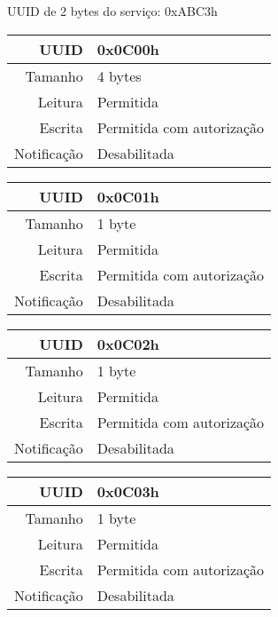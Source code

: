\begin{tcolorbox}[arc=3mm,fontupper=\small,fonttitle=\bfseries,
subtitle style={boxrule=0.4pt, colback=white},colframe=green!25!black,
halign=center,bottom=0mm,
title=Luminosity Sensor Service]
	UUID de 2 bytes do serviço: 0xABC3h
	
	\begin{tcbitemize}[raster columns=2,raster equal height,fontupper=\footnotesize,
	colbacktitle=yellow!100!red!100!black, coltitle=black,
	fonttitle=\footnotesize\bfseries,size=small, halign=center]
	
	\tcbitem [squeezed title={Sensing Interval Characteristic}]
		\begin{tabular}{ r | l }
		UUID & 0x0C00h \\ \hline
		Tamanho & 4 bytes \\ \hline
		Leitura & Permitida \\ \hline
		Escrita & Permitida com autorização \\ \hline
		Notificação & Desabilitada 
		\end{tabular}

		\tcbitem [squeezed title={Sensor Status Characteristic}]
		\begin{tabular}{ r | l }
		UUID & 0x0C01h \\ \hline
		Tamanho & 1 byte \\ \hline
		Leitura & Permitida \\ \hline
		Escrita & Permitida com autorização \\ \hline
		Notificação & Desabilitada 
		\end{tabular}
		
		\tcbitem [squeezed title={Sensor Integration Time Characteristic}]
		\begin{tabular}{ r | l }
		UUID & 0x0C02h \\ \hline
		Tamanho & 1 byte \\ \hline
		Leitura & Permitida \\ \hline
		Escrita & Permitida com autorização \\ \hline
		Notificação & Desabilitada 
		\end{tabular}
		
		\tcbitem [squeezed title={Sensor Gain Characteristic}]
		\begin{tabular}{ r | l }
		UUID & 0x0C03h \\ \hline
		Tamanho & 1 byte \\ \hline
		Leitura & Permitida \\ \hline
		Escrita & Permitida com autorização \\ \hline
		Notificação & Desabilitada 
		\end{tabular}


\end{tcbitemize}
\end{tcolorbox}

